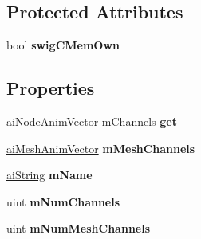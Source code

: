\subsection*{Protected Attributes}
\begin{DoxyCompactItemize}
\item 
\hypertarget{structai_animation_ac47fd6fa70f89a3be3b90d4008ce6130}{bool {\bfseries swig\+C\+Mem\+Own}}\label{structai_animation_ac47fd6fa70f89a3be3b90d4008ce6130}

\end{DoxyCompactItemize}
\subsection*{Properties}
\begin{DoxyCompactItemize}
\item 
\hypertarget{structai_animation_a47eb8305ad2ac0b1a6b940a35223a48e}{\hyperlink{classai_node_anim_vector}{ai\+Node\+Anim\+Vector} \hyperlink{structai_animation_a89244bb68b725ffbb85137174c28e757}{m\+Channels} {\bfseries get}}\label{structai_animation_a47eb8305ad2ac0b1a6b940a35223a48e}

\item 
\hypertarget{structai_animation_a8160bfc14421b13600158662e159ad68}{\hyperlink{classai_mesh_anim_vector}{ai\+Mesh\+Anim\+Vector} {\bfseries m\+Mesh\+Channels}}\label{structai_animation_a8160bfc14421b13600158662e159ad68}

\item 
\hypertarget{structai_animation_a8de0bb4f23cfd3b395483f125f3d5f93}{\hyperlink{structai_string}{ai\+String} {\bfseries m\+Name}}\label{structai_animation_a8de0bb4f23cfd3b395483f125f3d5f93}

\item 
\hypertarget{structai_animation_a58d5c6880c27122052175ada8be4d6c4}{uint {\bfseries m\+Num\+Channels}}\label{structai_animation_a58d5c6880c27122052175ada8be4d6c4}

\item 
\hypertarget{structai_animation_aa2df8c2fd18619f7dc302217385f8ef9}{uint {\bfseries m\+Num\+Mesh\+Channels}}\label{structai_animation_aa2df8c2fd18619f7dc302217385f8ef9}

\end{DoxyCompactItemize}



